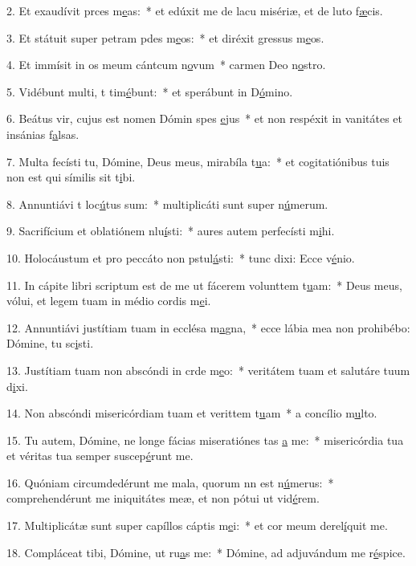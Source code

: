 2. Et exaudívit prces m\uline{e}as:~* et edúxit me de lacu misériæ, et de luto f\uline{æ}cis.\par 
3. Et státuit super petram pdes m\uline{e}os:~* et diréxit gressus m\uline{e}os.\par 
4. Et immísit in os meum cántcum n\uline{o}vum~* carmen Deo n\uline{o}stro.\par 
5. Vidébunt multi, t tim\uline{é}bunt:~* et sperábunt in D\uline{ó}mino.\par 
6. Beátus vir, cujus est nomen Dómin spes \uline{e}jus~* et non respéxit in vanitátes et insánias f\uline{a}lsas.\par 
7. Multa fecísti tu, Dómine, Deus meus, mirabíla t\uline{u}a:~* et cogitatiónibus tuis non est qui símilis sit t\uline{i}bi.\par 
8. Annuntiávi t loc\uline{ú}tus sum:~* multiplicáti sunt super n\uline{ú}merum.\par 
9. Sacrifícium et oblatiónem nlu\uline{í}sti:~* aures autem perfecísti m\uline{i}hi.\par 
10. Holocáustum et pro peccáto non pstul\uline{á}sti:~* tunc dixi: Ecce v\uline{é}nio.\par 
11. In cápite libri scriptum est de me ut fácerem volunttem t\uline{u}am:~* Deus meus, vólui, et legem tuam in médio cordis m\uline{e}i.\par 
12. Annuntiávi justítiam tuam in ecclésa m\uline{a}gna,~* ecce lábia mea non prohibébo: Dómine, tu sc\uline{i}sti.\par 
13. Justítiam tuam non abscóndi in crde m\uline{e}o:~* veritátem tuam et salutáre tuum d\uline{i}xi.\par 
14. Non abscóndi misericórdiam tuam et verittem t\uline{u}am~* a concílio m\uline{u}lto.\par 
15. Tu autem, Dómine, ne longe fácias miseratiónes tas \uline{a} me:~* misericórdia tua et véritas tua semper suscep\uline{é}runt me.\par 
16. Quóniam circumdedérunt me mala, quorum nn est n\uline{ú}merus:~* comprehendérunt me iniquitátes meæ, et non pótui ut vid\uline{é}rem.\par 
17. Multiplicátæ sunt super capíllos cáptis m\uline{e}i:~* et cor meum derel\uline{í}quit me.\par 
18. Compláceat tibi, Dómine, ut ru\uline{a}s me:~* Dómine, ad adjuvándum me r\uline{é}spice.\par 
